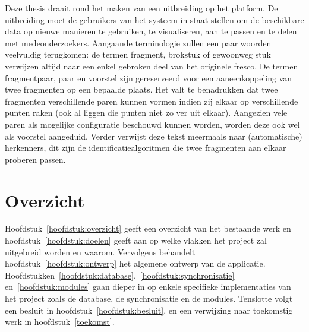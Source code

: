 Deze thesis draait rond het maken van een uitbreiding op het platform. De uitbreiding moet de gebruikers van het systeem in staat stellen om de beschikbare data op nieuwe manieren te gebruiken, te visualiseren, aan te passen en te delen met medeonderzoekers. Aangaande terminologie zullen een paar woorden veelvuldig terugkomen: de termen fragment, brokstuk of gewoonweg stuk verwijzen altijd naar een enkel gebroken deel van het originele fresco. De termen fragmentpaar, paar en voorstel zijn gereserveerd voor een aaneenkoppeling van twee fragmenten op een bepaalde plaats. Het valt te benadrukken dat twee fragmenten verschillende paren kunnen vormen indien zij elkaar op verschillende punten raken (ook al liggen die punten niet zo ver uit elkaar). Aangezien vele paren als mogelijke configuratie beschouwd kunnen worden, worden deze ook wel als voorstel aangeduid. Verder verwijst deze tekst meermaals naar (automatische) herkenners, dit zijn de identificatiealgoritmen die twee fragmenten aan elkaar proberen passen.\\

\section{Overzicht}
Hoofdstuk~\ref{hoofdstuk:overzicht} geeft een overzicht van het bestaande werk en hoofdstuk~\ref{hoofdstuk:doelen} geeft aan op welke vlakken het project zal uitgebreid worden en waarom. Vervolgens behandelt hoofdstuk~\ref{hoofdstuk:ontwerp} het algemene ontwerp van de applicatie. Hoofdstukken~\ref{hoofdstuk:database},~\ref{hoofdstuk:synchronisatie} en~\ref{hoofdstuk:modules} gaan dieper in op enkele specifieke implementaties van het project zoals de database, de synchronisatie en de modules. Tenslotte volgt een besluit in hoofdstuk~\ref{hoofdstuk:besluit}, en een verwijzing naar toekomstig werk in hoofdstuk~\ref{toekomst}.
